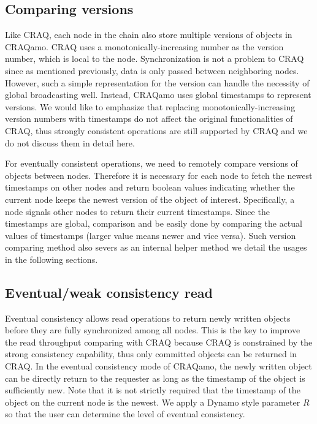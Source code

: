 \subsection{Comparing versions}
Like CRAQ, each node in the chain also store multiple versions of objects in CRAQamo. CRAQ uses a monotonically-increasing number as the version number, which is local to the node. Synchronization is not a problem to CRAQ since as mentioned previously, data is only passed between neighboring nodes. However, such a simple representation for the version can handle the necessity of global broadcasting well. Instead, CRAQamo uses global timestamps to represent versions. We would like to emphasize that replacing monotonically-increasing version numbers with timestamps do not affect the original functionalities of CRAQ, thus strongly consistent operations are still supported by CRAQ and we do not discuss them in detail here.

For eventually consistent operations, we need to remotely compare versions of objects between nodes. Therefore it is necessary for each node to fetch the newest timestamps on other nodes and return boolean values indicating whether the current node keeps the newest version of the object of interest. Specifically, a node signals other nodes to return their current timestamps. Since the timestamps are global, comparison and be easily done by comparing the actual values of timestamps (larger value means newer and vice versa). Such version comparing method also severs as an internal helper method we detail the usages in the following sections. 

\subsection{Eventual/weak consistency read}
Eventual consistency allows read operations to return newly written objects before they are fully synchronized among all nodes. This is the key to improve the read throughput comparing with CRAQ because CRAQ is constrained by the strong consistency capability, thus only committed objects can be returned in CRAQ. In the eventual consistency mode of CRAQamo, the newly written object can be directly return to the requester as long as the timestamp of the object is sufficiently new. Note that it is not strictly required that the timestamp of the object on the current node is the newest. We apply a Dynamo style parameter $R$ so that the user can determine the level of eventual consistency.

